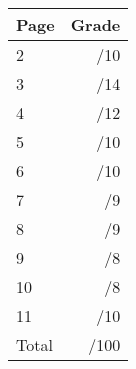 \documentclass[12pt]{article}
\newcommand{\skipline}{\vspace{12pt}}
\begin{document}
\begin{table}[hbt]
\begin{center}
\begin{tabular}{|l|r|} \hline
Page&Grade\\
\hline \hline
\cline{1-2} 2 & \enspace\enspace\enspace\enspace\enspace\enspace/10\\
\cline{1-2} 3 & \enspace\enspace\enspace\enspace\enspace\enspace/14\\
\cline{1-2} 4 & \enspace\enspace\enspace\enspace\enspace\enspace/12\\
\cline{1-2} 5 & \enspace\enspace\enspace\enspace\enspace\enspace/10\\
\cline{1-2} 6 & \enspace\enspace\enspace\enspace\enspace\enspace/10\\
\cline{1-2} 7 & \enspace\enspace\enspace\enspace\enspace\enspace/9\\
\cline{1-2} 8 & \enspace\enspace\enspace\enspace\enspace\enspace/9\\
\cline{1-2} 9 & \enspace\enspace\enspace\enspace\enspace\enspace/8\\
\cline{1-2} 10 & \enspace\enspace\enspace\enspace\enspace\enspace/8\\
\cline{1-2} 11 & \enspace\enspace\enspace\enspace\enspace\enspace/10\\
\cline{1-2} Total & \enspace\enspace\enspace\enspace\enspace\enspace/100\\
\hline
\end{tabular}

\skipline

\skipline

\skipline

\end{center}
\end{table}
\newpage
\end{document}

